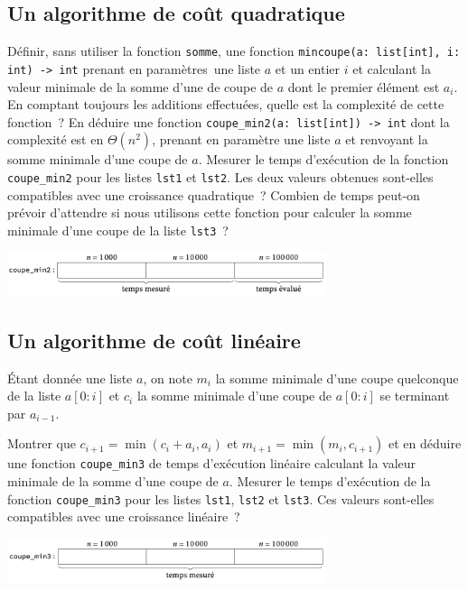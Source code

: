 \documentclass{magnolia}
\begin{document}
\subsection{Un algorithme de coût quadratique}

\begin{questions}
\question Définir, sans utiliser la fonction \verb!somme!, une fonction \verb!mincoupe(a: list[int], i: int) -> int!
  prenant en paramètres\ une liste $a$ et un entier $i$ et calculant la valeur minimale de la somme d'une de coupe de
  $a$ dont le premier élément est $a_i$. En comptant toujours les additions effectuées, quelle est la complexité
  de cette fonction~?
\question En déduire une fonction \verb!coupe_min2(a: list[int]) -> int! dont la complexité est en $\Theta(n^2)$,
  prenant en paramètre une liste $a$ et renvoyant la somme minimale d'une coupe de $a$.
\question Mesurer le temps d'exécution de la fonction \verb!coupe_min2! pour les listes \verb!lst1! et \verb!lst2!.
  Les deux valeurs obtenues sont-elles compatibles avec une croissance quadratique~? Combien de temps peut-on
  prévoir d'attendre si nous utilisons cette fonction pour calculer la somme minimale d'une coupe de la liste
  \verb!lst3!~?
  \begin{center}
    \includegraphics[width=0.7\textwidth]{../../Commun/Images/python-tp-coupe-2}
    \end{center} 
\end{questions}

\subsection{Un algorithme de coût linéaire}

Étant donnée une liste $a$, on note $m_i$ la somme minimale d'une coupe quelconque de la liste $a[0:i]$ et $c_i$
la somme minimale d'une coupe de $a[0:i]$ se terminant par $a_{i-1}$.
\begin{questions}
\question Montrer que $c_{i+1}=\min(c_i+a_i, a_i)$ et $m_{i+1}=\min(m_i, c_{i+1})$ et en déduire une fonction
  \verb!coupe_min3! de temps d'exécution linéaire calculant la valeur minimale de la somme d'une coupe de $a$.
\question Mesurer le temps d'exécution de la fonction \verb!coupe_min3! pour les listes \verb!lst1!, \verb!lst2!
  et \verb!lst3!. Ces valeurs sont-elles compatibles avec une croissance linéaire~?
  \begin{center}
    \includegraphics[width=0.7\textwidth]{../../Commun/Images/python-tp-coupe-3}
    \end{center} 
\end{questions}
\end{document}
